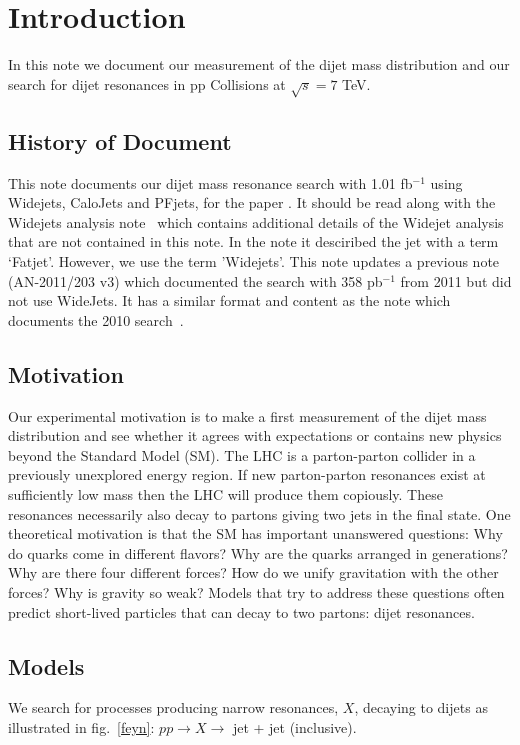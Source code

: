 \section{Introduction}
\label{chap:Intro}

In this note we document our measurement of the dijet mass
distribution and our search for dijet resonances in pp Collisions at
$\sqrt{s}=7$ TeV.

\subsection{History of Document}

This note documents our dijet mass resonance search with 1.01 fb$^{-1}$ using Widejets, CaloJets and 
PFjets, for the paper .  It should be read along with the Widejets
analysis note~\cite{CMS_AN_2011/242} which contains additional details of the Widejet analysis
that are not contained in this note. In the note it desciribed the jet with a term `Fatjet'.
However, we use the term 'Widejets'.
This note updates a previous note (AN-2011/203 v3) which documented the search with 358 pb$^{-1}$ from 2011 but did not use WideJets.
It has a similar format and content as the note which documents the 2010 search~\cite{CMS_AN_2010/108}.

\subsection{Motivation}
Our experimental motivation is to make a first measurement of the dijet mass distribution
and see whether it agrees with expectations or contains new physics beyond the Standard Model (SM).
The LHC is a parton-parton collider in a previously
unexplored energy region. If new parton-parton resonances exist at sufficiently low mass 
then the LHC will produce 
them copiously. These resonances necessarily also decay to partons giving two jets in the 
final state.  One theoretical motivation is that the SM has important unanswered questions:
Why do quarks come in different flavors?
Why are the quarks arranged in generations? Why are there four different forces? How do we unify gravitation with the other forces?
Why is gravity so weak? Models that try to address these questions often predict short-lived particles that
can decay to two partons: dijet resonances.

\subsection{Models}
We search for processes producing narrow resonances, $X$, decaying to dijets 
as illustrated in fig.~\ref{feyn}:
$pp \rightarrow X \rightarrow$ jet + jet (inclusive).


